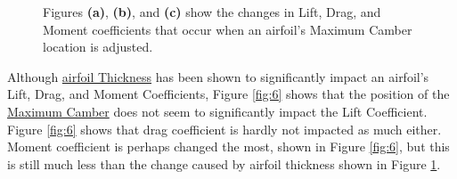 \documentclass{article}
\begin{document}
\begin{figure}[!htb]
  \centering
  \caption{Figures \textbf{(a)}, \textbf{(b)}, and \textbf{(c)} show the changes in Lift, Drag, and Moment coefficients that occur when an airfoil's Maximum Camber location is adjusted.}
  \label{fig:5}
\end{figure}

Although \hyperlink{Th}{airfoil Thickness} has been shown to significantly impact an airfoil's Lift, Drag, and Moment Coefficients, Figure \ref{fig:6} shows that the position of the \hyperlink{Camber}{Maximum Camber} does not seem to significantly impact the Lift Coefficient. Figure \ref{fig:6} shows that drag coefficient is hardly not impacted as much either. Moment coefficient is perhaps changed the most, shown in Figure \ref{fig:6}, but this is still much less than the change caused by airfoil thickness shown in Figure \ref{fig:5}.
\end{document}
